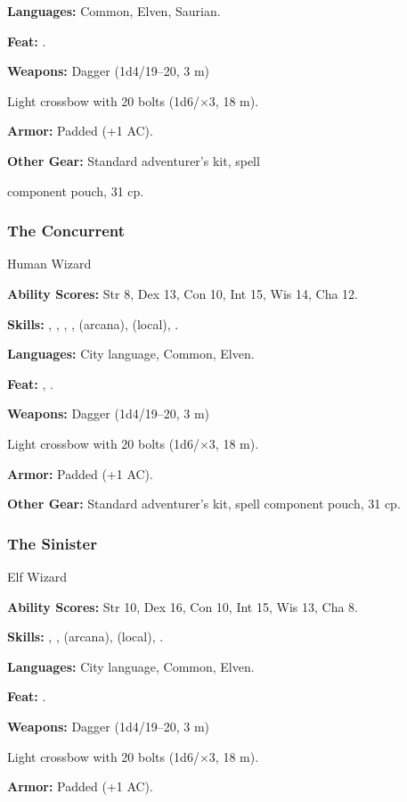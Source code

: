 \textbf{Languages:} Common, Elven, Saurian.

\textbf{Feat:} .

\textbf{Weapons:} Dagger (1d4/19--20, 3 m)

Light crossbow with 20 bolts (1d6/$\times$3, 18 m).

\textbf{Armor:} Padded (+1 AC).

\textbf{Other Gear:} Standard adventurer's kit, spell

component pouch, 31 cp.

\subsubsection{The Concurrent}
Human Wizard

\textbf{Ability Scores:} Str 8, Dex 13, Con 10, Int 15, Wis 14, Cha 12.

\textbf{Skills:} , , , ,  (arcana),  (local), .

\textbf{Languages:} City language, Common, Elven.

\textbf{Feat:} , .

\textbf{Weapons:} Dagger (1d4/19--20, 3 m)

Light crossbow with 20 bolts (1d6/$\times$3, 18 m).

\textbf{Armor:} Padded (+1 AC).

\textbf{Other Gear:} Standard adventurer's kit, spell component pouch, 31 cp.

\subsubsection{The Sinister}
Elf Wizard

\textbf{Ability Scores:} Str 10, Dex 16, Con 10, Int 15, Wis 13, Cha 8.

\textbf{Skills:} , ,  (arcana),  (local), .

\textbf{Languages:} City language, Common, Elven.

\textbf{Feat:} .

\textbf{Weapons:} Dagger (1d4/19--20, 3 m)

Light crossbow with 20 bolts (1d6/$\times$3, 18 m).

\textbf{Armor:} Padded (+1 AC).

